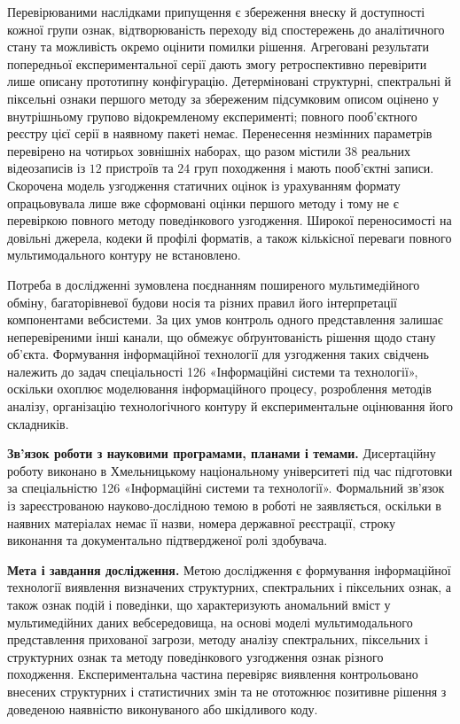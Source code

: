 Перевірюваними наслідками припущення є збереження внеску й доступності кожної групи ознак, відтворюваність переходу від спостережень до аналітичного стану та можливість окремо оцінити помилки рішення. Агреговані результати попередньої експериментальної серії дають змогу ретроспективно перевірити лише описану прототипну конфігурацію. Детерміновані структурні, спектральні й піксельні ознаки першого методу за збереженим підсумковим описом оцінено у внутрішньому групово відокремленому експерименті; повного пооб’єктного реєстру цієї серії в наявному пакеті немає. Перенесення незмінних параметрів перевірено на чотирьох зовнішніх наборах, що разом містили $38$ реальних відеозаписів із $12$ пристроїв та $24$ груп походження і мають пооб’єктні записи. Скорочена модель узгодження статичних оцінок із урахуванням формату опрацьовувала лише вже сформовані оцінки першого методу і тому не є перевіркою повного методу поведінкового узгодження. Широкої переносимості на довільні джерела, кодеки й профілі форматів, а також кількісної переваги повного мультимодального контуру не встановлено.

Потреба в дослідженні зумовлена поєднанням поширеного мультимедійного обміну, багаторівневої будови носія та різних правил його інтерпретації компонентами вебсистеми. За цих умов контроль одного представлення залишає неперевіреними інші канали, що обмежує обґрунтованість рішення щодо стану об’єкта. Формування інформаційної технології для узгодження таких свідчень належить до задач спеціальності 126 «Інформаційні системи та технології», оскільки охоплює моделювання інформаційного процесу, розроблення методів аналізу, організацію технологічного контуру й експериментальне оцінювання його складників.

\textbf{Зв’язок роботи з науковими програмами, планами і темами.}
Дисертаційну роботу виконано в Хмельницькому національному університеті під час підготовки за спеціальністю 126 «Інформаційні системи та технології». Формальний зв’язок із зареєстрованою науково-дослідною темою в роботі не заявляється, оскільки в наявних матеріалах немає її назви, номера державної реєстрації, строку виконання та документально підтвердженої ролі здобувача.

\textbf{Мета і завдання дослідження.}
Метою дослідження є формування інформаційної технології виявлення визначених структурних, спектральних і піксельних ознак, а також ознак подій і поведінки, що характеризують аномальний вміст у мультимедійних даних вебсередовища, на основі моделі мультимодального представлення прихованої загрози, методу аналізу спектральних, піксельних і структурних ознак та методу поведінкового узгодження ознак різного походження. Експериментальна частина перевіряє виявлення контрольовано внесених структурних і статистичних змін та не ототожнює позитивне рішення з доведеною наявністю виконуваного або шкідливого коду.

